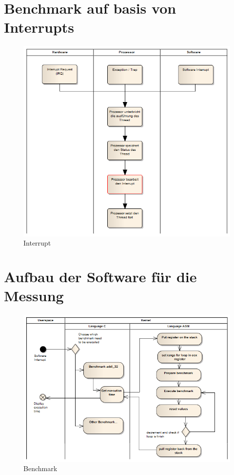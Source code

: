 
\section{Benchmark auf basis von Interrupts}
\label{chap:benchmark_basis_interrupts}


\begin{figure}[h]
\centering
\includegraphics[scale=0.5]{images/interrupt_ea.png}
\caption{Interrupt}
\label{fig:Interrupt}
\end{figure}

\section{Aufbau der Software für die Messung}


\begin{figure}[h]
\centering
\includegraphics[scale=0.5]{images/benchmark_ea.png}
\caption{Benchmark}
\label{fig:Benchmark}
\end{figure}

